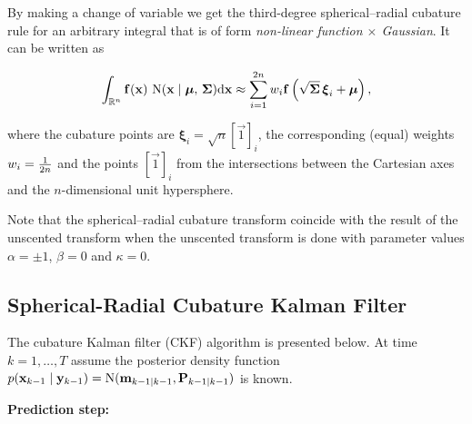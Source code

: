 By making a change of variable we get the third-degree spherical--radial cubature rule for an arbitrary integral that is of form \emph{non-linear function $\times$ Gaussian}. It can be written as

\begin{equation*}
    \int_{\mathbb{R}^n} \mathbf{f}(\mathbf{x})\,\operatorname{N}(\mathbf{x} \mid \boldsymbol{\mu},\, \mathbf{\Sigma})\mathrm{d}\mathbf{x} 
    \approx \sum_{i=1}^{2n} w_i \mathbf{f}\left(\sqrt{\mathbf{\Sigma}}\, \boldsymbol{\xi}_i +\boldsymbol{\mu} \right),
\end{equation*}

where the cubature points are $\boldsymbol{\xi}_i = \sqrt{n} [\vec{1}]_i$, the corresponding (equal) weights $w_i = {1 \over 2n}$ and the points $[\vec{1}]_i$ from the intersections between the Cartesian axes and the $n$-dimensional unit hypersphere.

Note that the spherical--radial cubature transform coincide with the result of the unscented transform when the unscented transform is done with parameter values $\alpha = \pm 1$, $\beta = 0$ and $\kappa = 0$.



%
\subsection{Spherical-Radial Cubature Kalman Filter}
%

The cubature Kalman filter (CKF) algorithm is presented below. At time $k = 1,\ldots,T$ assume the posterior density function $ p(\mathbf{x}_{k-1} \mid \mathbf{y}_{k-1}) = \operatorname{N}(\mathbf{m}_{k-1 \mid k-1},\mathbf{P}_{k-1 \mid k-1})$ is known.


\textbf{Prediction step:}

